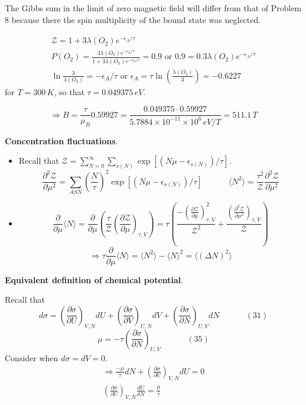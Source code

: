 The Gibbs sum in the limit of zero magnetic field will differ from that of Problem 8 because there the spin multiplicity of the bound state was neglected.  

\[
\begin{gathered}
  \mathcal{Z} = 1 + 3 \lambda(O_2) e^{- \epsilon_A/\tau} \\ 
  P(O_2) = \frac{ 3 \lambda(O_2) e^{-\epsilon_A/\tau} }{ 1 + 3 \lambda(O_2) e^{- \epsilon_A/\tau}} = 0.9 \text{ or } 0.9 = 0.3 \lambda(O_2) e^{ -\epsilon_A/\tau} \\
   \ln{ \frac{3}{\lambda(O_2)} } =  - \epsilon_A/\tau  \text{ or } \epsilon_A = \tau \ln{ \left( \frac{ \lambda(O_2) }{ 3} \right) } = -0.6227
\end{gathered}
\]
for $T = 300 \, K$, so that $\tau = 0.049375 \, eV$.  

\[
\Longrightarrow B = \frac{ \tau}{ \mu_B} 0.59927 = \frac{ 0.049375 \cdot 0.59927 }{ 5.7884 \times 10^{-11} \times 10^6 \, eV/T } = 511.1 \, T
\]





 \textbf{Concentration fluctuations}.  
\begin{itemize}
\item[(a)]
Recall that $\mathcal{Z} = \sum_{N=0}^{\infty} \sum_{s(N)} \exp{ [ (N \mu - \epsilon_{s(N)} )/\tau ] }$.  
\[
\frac{ \partial^2 \mathcal{Z} }{ \partial \mu^2}   = \sum_{ASN} \left( \frac{N}{\tau} \right)^2 \exp{ [ (N \mu - \epsilon_{s(N)} )/\tau ] } \quad \quad \quad \, \langle N^2 \rangle = \frac{ \tau^2 }{\mathcal{Z}} \frac{ \partial^2 \mathcal{Z}}{ \partial \mu^2 } 
\]
\item[(b)] 
\[
\frac{ \partial }{ \partial \mu} \langle N \rangle = \frac{ \partial }{ \partial \mu} \left( \frac{ \tau}{ \mathcal{Z} } \left( \frac{ \partial \mathcal{Z}}{ \partial \mu} \right)_{ \tau, V} \right) =\tau \left( \frac{ -  \left( \frac{ \partial \mathcal{Z}}{ \partial \mu} \right)^2_{\tau, V} }{ \mathcal{Z}^2} + \frac{ \left( \frac{ \partial^2 \mathcal{Z}}{  \partial \mu^2} \right)_{\tau, V} }{ \mathcal{Z}} \right) 
\]
\[
\Longrightarrow \tau \frac{ \partial}{ \partial \mu} \langle N \rangle = \langle N^2 \rangle - \langle N \rangle^2 = \langle ( \Delta N)^2 \rangle
\]
\end{itemize}

 \textbf{ Equivalent definition of chemical potential}.  

Recall that 
\[
d\sigma = \left( \frac{ \partial \sigma}{ \partial U} \right)_{V,N} dU + \left( \frac{ \partial \sigma}{ \partial V} \right)_{U,N} dV + \left( \frac{ \partial \sigma}{ \partial N } \right)_{U,V} dN \quad \quad \quad \, (31)
\]
\[
\mu = - \tau \left( \frac{ \partial \sigma}{ \partial N } \right)_{U,V} \quad \quad \quad \, (35)
\]
Consider when $d\sigma = dV =0$.  
\[
\begin{gathered}
  \Longrightarrow \frac{ - \mu }{ \tau} dN + \left( \frac{ \partial \sigma}{ \partial U } \right)_{V,N} dU = 0 \\
  \left( \frac{ \partial \sigma}{ \partial U} \right)_{V,N} \frac{dU}{dN} = \frac{ \mu}{ \tau}
\end{gathered}
\]

